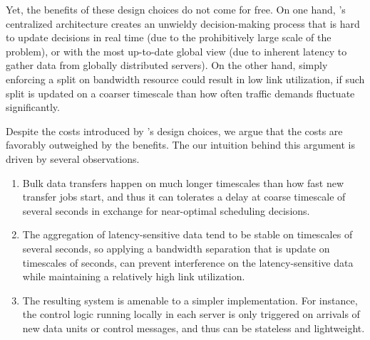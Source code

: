 Yet, the benefits of these design choices do not come for free. 
On one hand, \name's centralized architecture creates an unwieldy 
decision-making process that is hard to update decisions in real time 
(due to the prohibitively large scale of the problem),
or with the most up-to-date global view (due to inherent latency
to gather data from globally distributed servers).
On the other hand, simply enforcing a split on bandwidth resource
could result in low link utilization, if such split is updated on a
coarser timescale than how often traffic demands fluctuate 
significantly.



Despite the costs introduced by \name's design choices, 
we argue that the costs are favorably outweighed by the benefits.
The our intuition behind this argument is driven by several 
observations. 
\begin{enumerate}
\item Bulk data transfers happen on much longer timescales than 
how fast new transfer jobs start, and thus it can tolerates a delay
at coarse timescale of several seconds in exchange for near-optimal 
scheduling decisions. 
\item The aggregation of latency-sensitive data tend to be stable 
on timescales of several seconds, so applying a bandwidth separation 
that is update on timescales of seconds, can prevent interference on 
the latency-sensitive data while maintaining a relatively 
high link utilization. 
\item The resulting system is amenable to a simpler implementation. 
For instance, the control logic running locally in each server
is only triggered on arrivals of new data units or control messages, 
and thus can be stateless and lightweight.
\end{enumerate}


